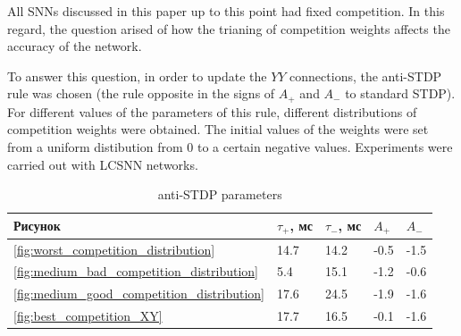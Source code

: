 \documentclass[a4paper,10pt]{article}
\begin{document}
All SNNs discussed in this paper up to this point had fixed competition. In this regard, the question arised of how the trianing of competition weights affects the accuracy of the network.

To answer this question, in order to update the $ YY $ connections, the anti-STDP rule was chosen (the rule opposite in the signs of $ A_{+} $ and $ A_{-} $ to standard STDP). For different values of the parameters of this rule, different distributions of competition weights were obtained. The initial values of the weights were set from a uniform distibution from 0 to a certain negative values. Experiments were carried out with LCSNN networks.

\begin{table}
 \caption{anti-STDP parameters}
\begin{center}
\begin{tabular}{|l|l|l|l|l|}
\hline
Рисунок & {$\tau_{+}$, мс} & {$\tau_{-}$, мс} & {$A_{+}$} & {$A_{-}$} \\
\hline
\ref{fig:worst_competition_distribution} & 14.7 & 14.2 & -0.5 & -1.5 \\
\hline
\ref{fig:medium_bad_competition_distribution} & 5.4 & 15.1 & -1.2 & -0.6 \\
\hline
\ref{fig:medium_good_competition_distribution} & 17.6 & 24.5 & -1.9 & -1.6 \\
\hline
\ref{fig:best_competition_XY} & 17.7 & 16.5 & -0.1 & -1.6\\
\hline
\end{tabular}
\end{center}
\end{table}
\end{document}
